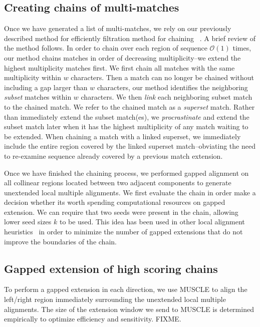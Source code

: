 \documentclass{ws-procs9x6}
\begin{document}
\subsection{Creating chains of multi-matches}

Once we have generated a list of multi-matches, we rely on our previously described method for efficiently filtration method for chaining ~\cite{ref-procrast}. A brief review of the method follows. In order to chain over each region of sequence $\mathcal{O}(1)$ times,
our method chains matches in order of decreasing multiplicity--we
extend the highest multiplicity matches first. We first chain all matches
with the same multiplicity within $w$
characters. Then a match can no
longer be chained without including a gap larger than $w$
characters, our method identifies the neighboring \textit{subset}
matches within $w$ characters. We then \textit{link} each
neighboring subset match to the chained match. We refer to the
chained match as a \textit{superset} match. Rather than immediately
extend the subset match(es), we \textit{procrastinate} and extend
the subset match later when it has the highest multiplicity of any
match waiting to be extended. When chaining a match with a linked
superset, we immediately include the entire region covered by the linked superset
match--obviating the need to re-examine sequence already covered by
a previous match extension.

Once we have finished the chaining process, we performed gapped alignment on all collinear regions located between two adjacent components to generate unextended local multiple alignments. We first evaluate the chain in order make a decision whether its worth spending computational resources on gapped extension. We can require that two seeds were present in the chain, allowing lower seed sizes $k$ to be used. This idea has been used in other local alignment heuristics~\cite{ref-blastz,ref-gappedblast,ref-blat} in order to minimize the number of gapped extensions that do not improve the boundaries of the chain.

\subsection{Gapped extension of high scoring chains}

To perform a gapped extension in each direction, we use MUSCLE to align the left/right region immediately surrounding the unextended local multiple alignments. The size of the extension window we send to MUSCLE is determined empirically to optimize efficiency and sensitivity. FIXME.
\end{document}
